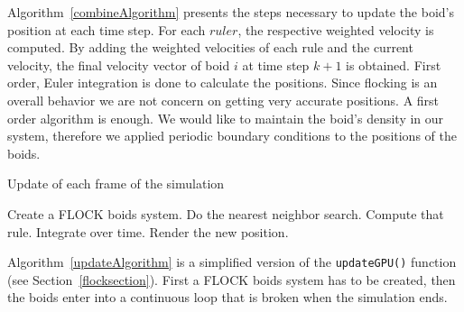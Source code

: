 Algorithm~\ref{combineAlgorithm} presents the steps necessary to update the boid's position at each time step. For each $rule r$, the respective weighted velocity is computed. By adding the weighted velocities of each rule and the current velocity, the final velocity vector of boid $i$ at time step $k+1$ is obtained. First order, Euler integration is done to calculate the positions. Since flocking is an overall behavior we are not concern on getting very accurate positions. A first order algorithm is enough. We would like to maintain the boid's density in our system, therefore we applied periodic boundary conditions to the positions of the boids.
 
\begin{algorithm}
\caption{Update of each frame of the simulation}
\label{updateAlgorithm}
\begin{algorithmic}
\STATE Create a FLOCK boids system.
\STATE Do the nearest neighbor search.
\STATE Compute that rule.
\STATE Integrate over time.
\STATE Render the new position.
\ENDFOR
\end{algorithmic}
\end{algorithm}

Algorithm~\ref{updateAlgorithm} is a simplified version of the \texttt{updateGPU()} function (see Section~\ref{flocksection}). First a FLOCK boids system has to be created, then the boids enter into a continuous loop that is broken when the simulation ends. 
